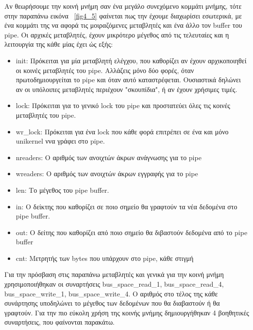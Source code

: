 Αν θεωρήσουμε την κοινή μνήμη σαν ένα μεγάλο συνεχόμενο κομμάτι μνήμης, τότε
στην παραπάνω εικόνα ~\ref{fig4_5} φαίνεται πως την έχουμε διαχωρίσει εσωτερικά,
με ένα κομμάτι της να αφορά τις μοιραζόμενες μεταβλητές και ένα άλλο τον buffer
του pipe. Οι αρχικές μεταβλητές, έχουν μικρότερο μέγεθος από τις τελευταίες και
η λειτουργία της κάθε μίας έχει ώς εξής:
\begin{itemize}
	\item init: Πρόκειται για μία μεταβλητή ελέγχου, που καθορίζει αν έχουν
		αρχικοποιηθεί οι κοινές μεταβλητές του pipe. Αλλάζεις μόνο δύο
		φορές, όταν πρωτοδημιουργείται το pipe και όταν αυτό
		καταστρέφεται. Ουσιαστικά δηλώνει αν οι υπόλοιπες μεταβλητές
		περιέχουν "σκουπίδια", ή αν έχουν χρήσιμες τιμές.
	\item lock: Πρόκειται για το γενικό lock του pipe και προστατεύει όλες
		τις κοινές μεταβλητές του pipe. 
	\item wr\_lock: Πρόκειται για ένα lock που κάθε φορά επιτρέπει σε ένα
		και μόνο unikernel ννα γράφει στο pipe. 
	\item nreaders: Ο αριθμός των ανοιχτών άκρων ανάγνωσης για το pipe
	\item wreaders: Ο αριθμός των ανοιχτών άκρων εγγραφής για το pipe
	\item len: Το μέγεθος του pipe buffer.
	\item in: Ο δείκτης που καθορίζει σε ποιο σημείο θα γραφτούν τα νέα
		δεδομένα στο pipe buffer.
	\item out: Ο δείτης που καθορίζει από ποιο σημείο θα διβαστούν δεδομένα
		από το pipe buffer
	\item cnt: Μετρητής των bytes που υπάρχουν στο pipe, κάθε στιγμή
\end{itemize}

Για την πρόσβαση στις παραπάνω μεταβλητές και γενικά για την κοινή μνήμη
χρησιμοποιήθηκαν οι συναρτήσεις bus\_space\_read\_1, bus\_space\_read\_4,
bus\_space\_write\_1, bus\_space\_write\_4. Ο αριθμός στο τέλος της κάθε
συνάρτησης υποδηλώνει το μέγεθος των δεδομένων που θα διαβαστούν ή θα γραφτούν.
Για την πιο εύκολη χρήση της κοινής μνήμης δημιουργήθηκαν 4 βοηθητικές
συναρτήσεις, που φαίνονται παρακάτω. 

